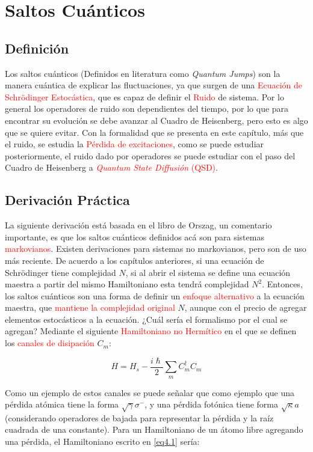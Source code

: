 \documentclass{book}
\begin{document}
\chapter{Saltos Cuánticos}
\section{Definición}
Los saltos cuánticos (Definidos en literatura como \textit{Quantum Jumps}) son la manera cuántica de explicar las fluctuaciones, ya que surgen de una \textcolor{red}{Ecuación de Schr\"odinger Estocástica}, que es capaz de definir el \textcolor{red}{Ruido} de sistema. Por lo general los operadores de ruido son dependientes del tiempo, por lo que para encontrar su evolución se debe avanzar al Cuadro de Heisenberg, pero esto es algo que se quiere evitar. Con la formalidad que se presenta en este capítulo, más que el ruido, se estudia la \textcolor{red}{Pérdida de excitaciones}, como se puede estudiar posteriormente, el ruido dado por operadores se puede estudiar con el paso del Cuadro de Heisenberg a \textcolor{red}{\textit{Quantum State Diffusión} (QSD)}.

\section{Derivación Práctica}

La siguiente derivación está basada en el libro de Orszag, un comentario importante, es que los saltos cuánticos definidos acá son para sistemas \textcolor{red}{markovianos}. Existen derivaciones para sistemas no markovianos, pero son de uso más reciente. De acuerdo a los capítulos anteriores, si una ecuación de Schr\"odinger tiene complejidad $N$, si al abrir el sistema se define una ecuación maestra a partir del mismo Hamiltoniano esta tendrá complejidad $N^2$. Entonces, los saltos cuánticos son una forma de definir un \textcolor{red}{enfoque alternativo} a la ecuación maestra, que \textcolor{red}{mantiene la complejidad original} $N$, aunque con el precio de agregar elementos estocásticos a la ecuación. ¿Cuál sería el formalismo por el cual se agregan?  Mediante el siguiente \textcolor{red}{Hamiltoniano no Hermítico} en el que se definen los \textcolor{red}{canales de disipación} $C_m$:

\begin{equation}\label{eq4.1}H=H_s-\frac{i\hslash}{2}\sum_m C_m^\dag C_m
\end{equation}

Como un ejemplo de estos canales se puede señalar que como ejemplo que una pérdida atómica tiene la forma $\sqrt{\gamma}\sigma^-$, y una pérdida fotónica tiene forma $\sqrt{\kappa} a$ (considerando operadores de bajada para representar la pérdida y la raíz cuadrada de una constante). Para un Hamiltoniano de un átomo libre agregando una pérdida, el Hamiltoniano escrito en \ref{eq4.1} sería:
\end{document}
